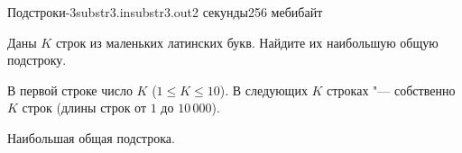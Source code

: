 \begin{problem}{Подстроки-3}{substr3.in}{substr3.out}{2 секунды}{256 мебибайт}{}


Даны $K$ строк из маленьких латинских букв. Найдите их наибольшую общую подстроку.

\InputFile

В первой строке число $K$ ($1 \le K \le 10$). 
В следующих $K$ строках "--- собственно $K$ строк (длины строк от $1$ до $10\,000$).

\OutputFile

Наибольшая общая подстрока.

\Examples

\begin{example}
%
\end{example}

\end{problem}
   
